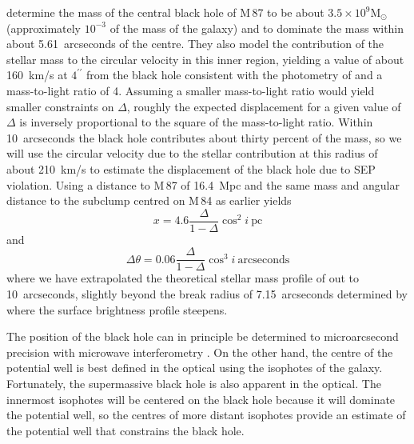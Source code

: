 \documentclass[useAMS,usenatbib]{mn2e}
\newcommand{\msun}{\mathrm{M}_\odot}
\begin{document}
\citet{2013ApJ...770...86W} determine the mass of the central black
hole of M\,87 to be about $3.5 \times 10^{9} \msun$ (approximately
$10^{-3}$ of the mass of the galaxy) and to dominate the mass 
within about 5.61~arcseconds of the centre.  They also model the
contribution of the stellar mass to the circular velocity in this
inner region, yielding a value of about 160~km/s at $4^{\prime\prime}$
from the black hole consistent with the photometry of
\citet{2006ApJS..164..334F} and a mass-to-light ratio of 4. Assuming a
smaller mass-to-light ratio would yield smaller 
constraints 
on $\Delta$,
roughly the expected displacement for a given value of $\Delta$ is
inversely proportional to the square of the mass-to-light ratio.
Within 10~arcseconds the black hole contributes about thirty percent
of the mass, so we will use the circular velocity due to the stellar
contribution at this radius of about 210~km/s to estimate the
displacement of the black hole due to SEP violation.  Using a distance
to M\,87 of 16.4~Mpc \citep{2010A&A...524A..71B} and the same mass and
angular distance to the subclump centred on M\,84 as earlier yields
\begin{equation}
  x = 4.6 \frac{\Delta}{1-\Delta} \cos^2 i ~\mathrm{pc}
  \label{eq:18}
\end{equation}
and
\begin{equation}
    \Delta \theta = 0.06 \frac{\Delta}{1-\Delta} \cos^3 i~
    \mathrm{arcseconds}
    \label{eq:17}
\end{equation}
where we have extrapolated the theoretical stellar mass profile of
\citet{2013ApJ...770...86W} out to 10~arcseconds, slightly beyond the
break radius of 7.15~arcseconds determined by
\cite{2006ApJS..164..334F} where the surface brightness profile
steepens.


The position of the black hole can in principle be determined to
microarcsecond precision with microwave interferometry
\citep{2011ApJ...735...57B}.  On the other hand, the centre of the
potential well is best defined in the optical using the isophotes of
the galaxy.  Fortunately, the supermassive black hole is also apparent
in the optical.  The innermost isophotes will be centered on the black
hole because it will dominate the potential well, so the centres of
more distant isophotes provide an estimate of the potential well that
constrains the black hole.
\end{document}
